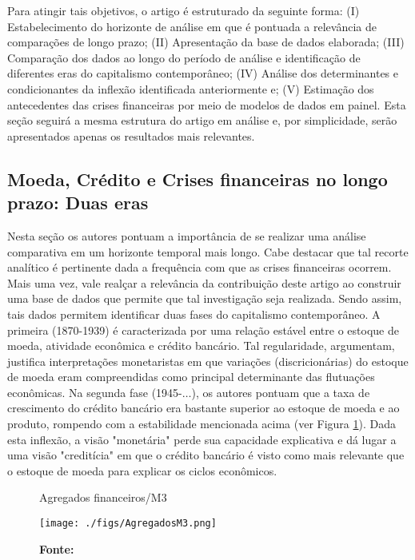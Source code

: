 \documentclass[11pt]{article}
\begin{document}
Para atingir tais objetivos, o artigo é estruturado da seguinte forma:
    (I) Estabelecimento do horizonte de análise em que é pontuada a relevância de comparações de longo prazo;
    (II) Apresentação da base de dados elaborada;
    (III) Comparação dos dados ao longo do período de análise e identificação de diferentes eras do capitalismo contemporâneo;
    (IV) Análise dos determinantes e condicionantes da inflexão identificada anteriormente e;
    (V) Estimação dos antecedentes das crises financeiras por meio de modelos de dados em painel.
Esta seção seguirá a mesma estrutura do artigo em análise e, por simplicidade, serão apresentados apenas os resultados mais relevantes.

\subsection*{Moeda, Crédito e Crises financeiras no longo prazo: Duas eras}
\label{sec:org7fc6a21}

Nesta seção os autores pontuam a importância de se realizar uma análise comparativa em um horizonte temporal mais longo.
Cabe destacar que tal recorte analítico é pertinente dada a frequência com que as crises financeiras ocorrem.
Mais uma vez, vale realçar a relevância da contribuição deste artigo ao construir uma base de dados que permite que tal investigação seja realizada.
Sendo assim, tais dados permitem identificar duas fases do capitalismo contemporâneo.
A primeira (1870-1939) é caracterizada por uma relação estável entre o estoque de moeda, atividade econômica e crédito bancário.
Tal regularidade, argumentam, justifica interpretações monetaristas em que variações (discricionárias) do estoque de moeda eram compreendidas como principal determinante das flutuações econômicas.
Na segunda fase (1945-\(\ldots\)), os autores pontuam que a taxa de crescimento do crédito bancário era bastante superior ao estoque de moeda e ao produto, rompendo com a estabilidade mencionada acima (ver Figura \ref{fig:agregados}).
Dada esta inflexão, a visão "monetária" perde sua capacidade explicativa e dá lugar a uma visão "creditícia" em que o crédito bancário é visto como mais relevante que o estoque de moeda para explicar os ciclos econômicos.


\begin{figure}[htb]
\centering
\caption{Agregados financeiros/M3}
\texttt{[image: ./figs/AgregadosM3.png]}
\label{fig:agregados}
\caption*{\textbf{Fonte:} \textcite[p.~ 1035]{schularickCreditBoomsGone2012}}
\end{figure}
\end{document}
